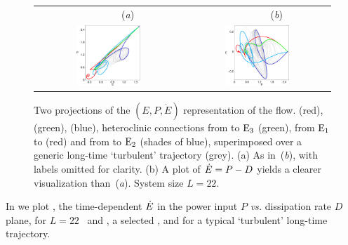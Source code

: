 \begin{figure}[t]
\begin{center}
 \begin{tabular}{cc}
        ~~~~~~~~(\textit{a})                        &   ~~~~~~~~(\textit{b}) \\
    \includegraphics[width=0.46\textwidth, clip=true]{figs/connEP.eps}     & \includegraphics[width=0.46\textwidth, clip=true]{figs/connPEdot.eps}
 \end{tabular}
\end{center}
\caption{
Two projections of the $(E,P,\dot{E})$ representation of the flow.
 (red),  (green),  (blue),
heteroclinic connections from  to $\mathrm{E}_{3}$ (green),
from $\mathrm{E}_{1}$ to  (red)
and from  to $\mathrm{E}_{2}$ (shades of blue), superimposed over
a generic long-time `turbulent' trajectory (grey).
(a) As in \,(\textit{b}),
with labels omitted for clarity.
(b) A plot of  $\dot{E} = P - D$ yields a clearer
visualization than \,(\textit{a}).
System size $L=22$.
        }
\label{f:drivedragConn}
\end{figure}

In  we plot , the time-dependent
$\dot{E}$ in the power input $P$ {\em vs.}
dissipation rate $D$ plane, for $L=22$ \eqva\ and \reqva,
a selected \rpo, and for a typical `turbulent' long-time
trajectory.

